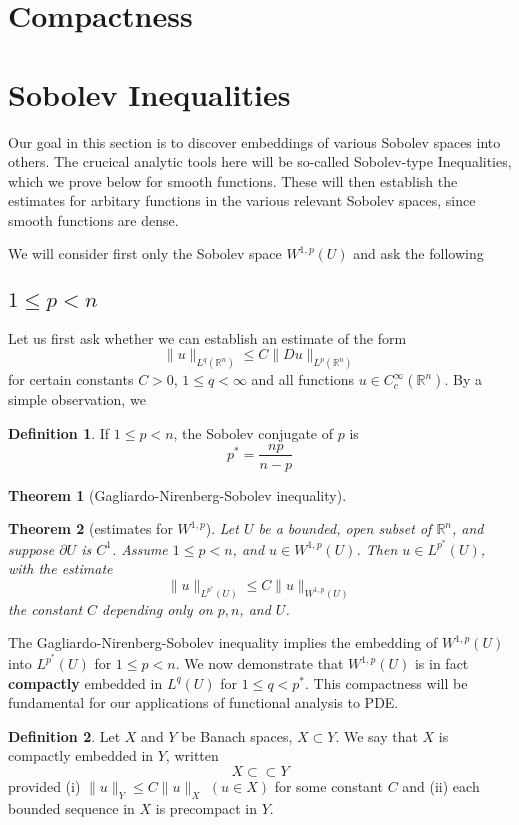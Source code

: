 \documentclass{article}
\newtheorem{theorem}{Theorem}[section]
\theoremstyle{definition}
\newtheorem{definition}{Definition}[section]
\begin{document}
\section{Compactness}




\section{Sobolev Inequalities}
Our goal in this section is to discover embeddings of various Sobolev spaces into others. 
The crucical analytic tools here will be so-called Sobolev-type Inequalities, which we prove below for smooth functions.
These will then establish the estimates for arbitary functions in the various relevant Sobolev spaces, since smooth functions are dense.

We will consider first only the Sobolev space $W^{1,p}(U)$ and ask the following 
\subsection{$1\le p<n$}

Let us first ask whether we can establish an estimate of the form 
\[ \|u\|_{L^q(\mathbb{R}^n)}\le C\|Du\|_{L^p(\mathbb{R}^n)}\] 
for certain constants $C>0$, $1\le q<\infty$ and all functions $u\in C^\infty_c(\mathbb{R}^n)$.
By a simple observation, we 
\begin{definition}
    If $1\le p<n$, the Sobolev conjugate of $p$ is 
    \[p^*=\frac{np}{n-p}\] 
\end{definition}

\begin{theorem}[Gagliardo-Nirenberg-Sobolev inequality]
    
\end{theorem}

\begin{theorem}[estimates for $W^{1,p}$]
    Let $U$ be a bounded, open subset of $\mathbb{R}^n$, and suppose $\partial U$ is $C^1$. Assume $1\le p<n$, and $u\in W^{1,p}(U)$.
    Then $u\in L^{p^*}(U)$, with the estimate 
    \[ \|u\|_{L^{p^*}(U)}\le C\|u\|_{W^{1,p}(U)}\] 
    the constant $C$ depending only on $p,n$, and $U$.
\end{theorem}


The Gagliardo-Nirenberg-Sobolev inequality implies the embedding of $W^{1,p}(U)$ into $L^{p^*}(U)$ for $1\le p<n$.
We now demonstrate that $W^{1,p}(U)$ is in fact \textbf{compactly} embedded in $L^q(U)$ for $1\le q<p^*$.
This compactness will be fundamental for our applications of functional analysis to PDE.
\begin{definition}
    Let $X$ and $Y$ be Banach spaces, $X\subset Y$. We say that $X$ is compactly embedded in $Y$, written 
    \[X\subset \subset Y\] 
    provided \newline 
    (i) $\|u\|_Y\le C\|u\|_X$ $(u\in X)$ for some constant $C$ and \newline 
    (ii) each bounded sequence in $X$ is precompact in $Y$.
\end{definition}
\end{document}
